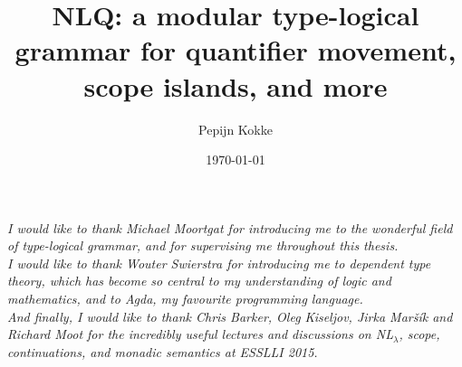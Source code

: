 \documentclass[a4paper]{article}
\title{NLQ: a modular type-logical grammar for quantifier movement,
  scope islands, and more}
\author{Pepijn Kokke}
\date{\today}
\begin{document}
\clearpage

\vspace*{\fill}
\begin{center}\itshape
  \noindent
  I would like to thank Michael Moortgat for introducing me to the
  wonderful field of type-logical grammar, and for supervising me
  throughout this thesis.
  \\[1\baselineskip]

  \noindent
  I would like to thank Wouter Swierstra for introducing me to
  dependent type theory, which has become so central to my
  understanding of logic and mathematics, and to Agda, my favourite
  programming language.
  \\[1\baselineskip]

  \noindent
  And finally, I would like to thank Chris Barker, Oleg Kiseljov,
  Jirka Maršík and Richard Moot for the incredibly useful lectures and
  discussions on NL$_{\lambda}$, scope, continuations, and monadic
  semantics at ESSLLI 2015.
  \\[1\baselineskip]
\end{center}
\vspace*{\fill}
\tableofcontents
\clearpage







\clearpage
{}

%

\renewcommand\thesection{A}

\renewcommand\thesection{B}

\end{document}
